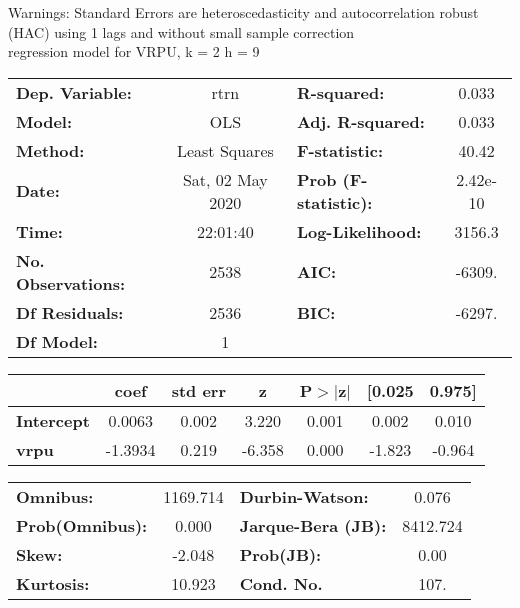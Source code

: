 Warnings: \newline
 [1] Standard Errors are heteroscedasticity and autocorrelation robust (HAC) using 1 lags and without small sample correction\\ 

regression model for VRPU, k = 2 h = 9\begin{center}
\begin{tabular}{lclc}
\toprule
\textbf{Dep. Variable:}    &       rtrn       & \textbf{  R-squared:         } &     0.033   \\
\textbf{Model:}            &       OLS        & \textbf{  Adj. R-squared:    } &     0.033   \\
\textbf{Method:}           &  Least Squares   & \textbf{  F-statistic:       } &     40.42   \\
\textbf{Date:}             & Sat, 02 May 2020 & \textbf{  Prob (F-statistic):} &  2.42e-10   \\
\textbf{Time:}             &     22:01:40     & \textbf{  Log-Likelihood:    } &    3156.3   \\
\textbf{No. Observations:} &        2538      & \textbf{  AIC:               } &    -6309.   \\
\textbf{Df Residuals:}     &        2536      & \textbf{  BIC:               } &    -6297.   \\
\textbf{Df Model:}         &           1      & \textbf{                     } &             \\
\bottomrule
\end{tabular}
\begin{tabular}{lcccccc}
                   & \textbf{coef} & \textbf{std err} & \textbf{z} & \textbf{P$> |$z$|$} & \textbf{[0.025} & \textbf{0.975]}  \\
\midrule
\textbf{Intercept} &       0.0063  &        0.002     &     3.220  &         0.001        &        0.002    &        0.010     \\
\textbf{vrpu}      &      -1.3934  &        0.219     &    -6.358  &         0.000        &       -1.823    &       -0.964     \\
\bottomrule
\end{tabular}
\begin{tabular}{lclc}
\textbf{Omnibus:}       & 1169.714 & \textbf{  Durbin-Watson:     } &    0.076  \\
\textbf{Prob(Omnibus):} &   0.000  & \textbf{  Jarque-Bera (JB):  } & 8412.724  \\
\textbf{Skew:}          &  -2.048  & \textbf{  Prob(JB):          } &     0.00  \\
\textbf{Kurtosis:}      &  10.923  & \textbf{  Cond. No.          } &     107.  \\
\bottomrule
\end{tabular}
\end{center}

